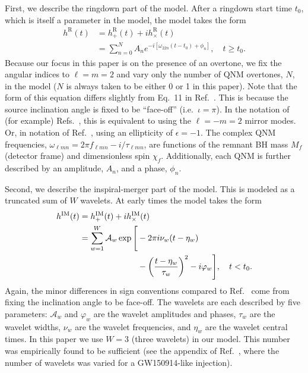 First, we describe the ringdown part of the model.
After a ringdown start time $t_0$, which is itself a parameter in the model, the model takes the form
\begin{align}
	h^\mathrm{R}(t) &= h_+^\mathrm{R}(t) + ih_\times^\mathrm{R}(t) \nonumber \\
	&= \sum_{n=0}^N A_n e^{-i[\omega_{22n}(t-t_0) + \phi_{n}]}, \quad t \geq t_0. \label{eq:ringdown_model}
\end{align}
Because our focus in this paper is on the presence of an overtone, we fix the angular indices to $\ell = m = 2$ and vary only the number of QNM overtones, $N$, in the model ($N$ is always taken to be either 0 or 1 in this paper). 
Note that the form of this equation differs slightly from Eq.~11 in Ref.~\cite{Finch:2021qph}. This is because the source inclination angle is fixed to be ``face-off'' (i.e.\ $\iota=\pi$).
In the notation of (for example) Refs.~\cite{Dhani:2020nik, Finch:2021iip, MaganaZertuche:2021syq}, this is equivalent to using the $\ell = -m = 2$ mirror modes. 
Or, in notation of Ref.~\cite{Isi:2021iql}, using an ellipticity of $\epsilon = -1$.
The complex QNM frequencies, $\omega_{\ell m n} = 2\pi f_{\ell m n} - i/\tau_{\ell m n}$, are functions of the remnant BH mass $M_f$ (detector frame) and dimensionless spin $\chi_f$.
Additionally, each QNM is further described by an amplitude, $A_{n}$, and a phase, $\phi_{n}$. 

Second, we describe the inspiral-merger part of the model.
This is modeled as a truncated sum of $W$ wavelets.
At early times the model takes the form
\begin{align} 
	h^\mathrm{IM}(t) &=  h_+^\mathrm{IM}(t) + ih_\times^\mathrm{IM}(t) \nonumber \\
	&= \sum_{w=1}^{W} \mathcal{A}_w \exp \Bigg[-2\pi i \nu_w(t-\eta_w) \label{eq:wavelets} \\
	&\hspace{2.46cm} - \qty(\frac{t-\eta_w}{\tau_w})^2 - i\varphi_w \Bigg], \quad t < t_0. \nonumber
\end{align}
Again, the minor differences in sign conventions compared to Ref.~\cite{Finch:2021qph} come from fixing the inclination angle to be face-off. 
The wavelets are each described by five parameters: $\mathcal{A}_w$ and $\varphi_w$ are the wavelet amplitudes and phases, $\tau_w$ are the wavelet widths, $\nu_w$ are the wavelet frequencies, and $\eta_w$ are the wavelet central times. 
In this paper we use $W=3$ (three wavelets) in our model.
This number was empirically found to be sufficient (see the appendix of Ref.~\cite{Finch:2021qph}, where the number of wavelets was varied for a GW150914-like injection).

